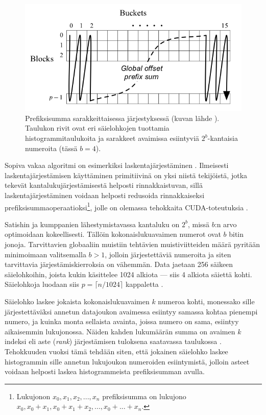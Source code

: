 \documentclass[a4paper,11pt]{article}
\newcommand{\engl}[1]{\foreignlanguage{english}{\em #1}}
\begin{document}
\begin{figure}
\centering
\includegraphics[scale = 0.5]{prefixsum}
\caption{Prefiksisumma sarakkeittaisessa järjestyksessä (kuvan lähde \cite{satish2009}). Taulukon rivit ovat eri säielohkojen tuottamia histogrammitaulukoita ja sarakkeet avaimissa esiintyviä $2^b$-kantaisia numeroita (tässä $b = 4$).}
\label{fig:columnscan}
\end{figure}

Sopiva vakaa algoritmi on esimerkiksi laskentajärjestäminen \cite{clrs}. Ilmeisesti laskentajärjestämisen käyttäminen primitiivinä on yksi niistä tekijöistä, jotka tekevät kantalukujärjestämisestä helposti rinnakkaistuvan, sillä laskentajärjestäminen voidaan helposti redusoida rinnakkaiseksi prefiksisummaoperaatioksi\footnote{Lukujonon $x_0, x_1, x_2, ..., x_n$ prefiksisumma on lukujono $x_0, x_0 + x_1, x_0 + x_1 + x_2, ..., x_0 + ... + x_n$.}, jolle on olemassa tehokkaita CUDA-toteutuksia \cite{satish2009}.

Satishin ja kumppanien \cite{satish2009} lähestymistavassa kantaluku on $2^b$, missä $b$:n arvo optimoidaan kokeellisesti. Tällöin kokonaislukuavaimen numerot ovat $b$ bitin jonoja. Tarvittavien globaaliin muistiin tehtävien muistiviitteiden määrä pyritään minimoimaan valitsemalla $b > 1$, jolloin järjestettäviä numeroita ja siten tarvittavia järjestämiskierroksia on vähemmän. Data jaetaan 256 säikeen säielohkoihin, joista kukin käsittelee 1024 alkiota --- siis 4 alkiota säiettä kohti. Säielohkoja luodaan siis $p = \lceil n/1024 \rceil$ kappaletta \cite{satish2009}.

Säielohko laskee jokaista kokonaislukuavaimen $k$ numeroa kohti, monessako sille järjestettäväksi annetun datajoukon avaimessa esiintyy samassa kohtaa pienempi numero, ja kuinka monta sellaista avainta, joissa numero on sama, esiintyy aikaisemmin lukujonossa. Näiden kahden lukumäärän summa on avaimen $k$ indeksi eli aste (\engl{rank}) järjestämisen tuloksena saatavassa taulukossa \cite{satish2009}. Tehokkuuden vuoksi tämä tehdään siten, että jokainen säielohko laskee histogrammin sille annetun lukujoukon numeroiden esiintymistä, jolloin asteet voidaan helposti laskea histogrammeista prefiksisumman avulla.
\end{document}
